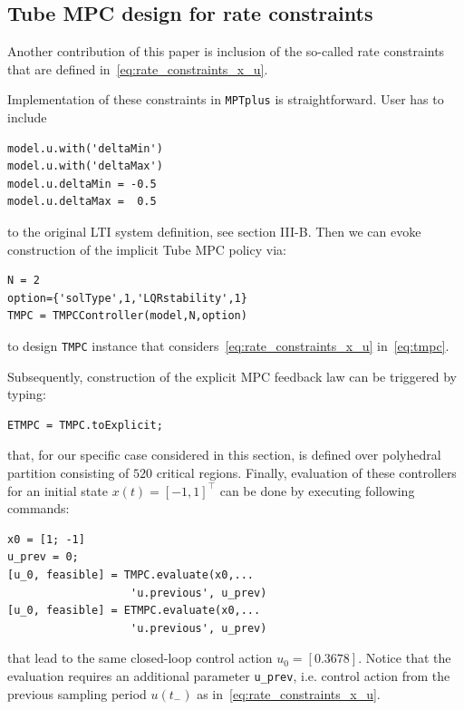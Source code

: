 \documentclass[letterpaper, 10 pt, conference]{ieeeconf}
\begin{document}


\subsection{Tube MPC design for rate constraints}
\label{sec:mptplus_tube_mpc_delta_u}

Another contribution of this paper is inclusion of the so-called rate constraints that are defined in~\eqref{eq:rate_constraints_x_u}.

Implementation of these constraints in \texttt{MPTplus} is straightforward. User has to include 
\begin{verbatim}
model.u.with('deltaMin')
model.u.with('deltaMax')
model.u.deltaMin = -0.5
model.u.deltaMax =  0.5
\end{verbatim}
to the original LTI system definition, see section III-B. Then we can evoke construction of the implicit Tube MPC policy via:
\begin{verbatim}
N = 2
option={'solType',1,'LQRstability',1}
TMPC = TMPCController(model,N,option)
\end{verbatim}
to design \texttt{TMPC} instance that considers~\eqref{eq:rate_constraints_x_u} in~\eqref{eq:tmpc}.

Subsequently, construction of the explicit MPC feedback law can be triggered by typing:
\begin{verbatim}
ETMPC = TMPC.toExplicit;
\end{verbatim}
that, for our specific case considered in this section, is defined over polyhedral partition consisting of $520$ critical regions.
Finally, evaluation of these controllers for an initial state $x(t) = [-1, 1]^\top$ can be done by executing following commands:
\begin{verbatim}
x0 = [1; -1]
u_prev = 0;
[u_0, feasible] = TMPC.evaluate(x0,...
                   'u.previous', u_prev)
[u_0, feasible] = ETMPC.evaluate(x0,...
                   'u.previous', u_prev)
\end{verbatim}
that lead to the same closed-loop control action $u_0 = [0.3678]$.
Notice that the evaluation requires an additional parameter \verb|u_prev|, i.e. control action from the previous sampling period $u(t_{-})$ as in~\eqref{eq:rate_constraints_x_u}.
\end{document}
